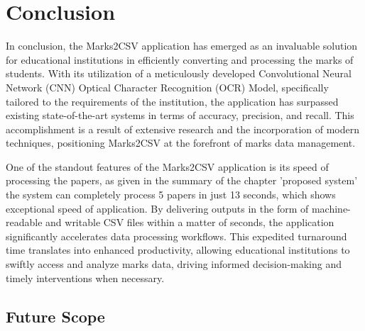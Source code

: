 \chapter{Conclusion}

In conclusion, the Marks2CSV application has emerged as an invaluable solution for educational institutions in efficiently converting and processing the marks of students. With its utilization of a meticulously developed Convolutional Neural Network (CNN) Optical Character Recognition (OCR) Model, specifically tailored to the requirements of the institution, the application has surpassed existing state-of-the-art systems in terms of accuracy, precision, and recall. This accomplishment is a result of extensive research and the incorporation of modern techniques, positioning Marks2CSV at the forefront of marks data management.

\noindent One of the standout features of the Marks2CSV application is its speed of processing the papers, as given in the summary of the chapter 'proposed system' the system can completely process 5 papers in just 13 seconds, which shows exceptional speed of application. By delivering outputs in the form of machine-readable and writable CSV files within a matter of seconds, the application significantly accelerates data processing workflows. This expedited turnaround time translates into enhanced productivity, allowing educational institutions to swiftly access and analyze marks data, driving informed decision-making and timely interventions when necessary.

\section{Future Scope}

